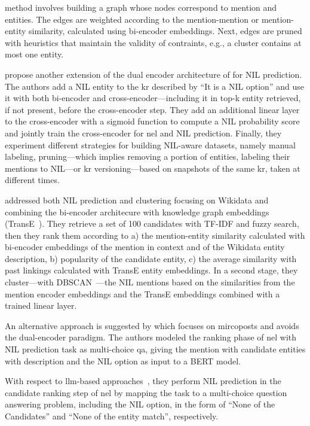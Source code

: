 \textcite{agarwal-etal-2022-entity} method involves building a graph whose nodes correspond to mention and entities. The edges are weighted according to the mention-mention or mention-entity similarity, calculated using bi-encoder embeddings. Next, edges are pruned with heuristics that maintain the validity of contraints, e.g., a cluster contains at most one entity.

\textcite{dong_reveal_the_unknown_2023} propose another extension of the dual encoder architecture of \textcite{blink} for NIL prediction. The authors add a NIL entity to the \ac{kr} described by ``It is a NIL option'' and use it with both bi-encoder and cross-encoder---including it in top-k entity retrieved, if not present, before the cross-encoder step. They add an additional linear layer to the cross-encoder with a sigmoid function to compute a NIL probability score and jointly train the cross-encoder for \ac{nel} and NIL prediction. Finally, they experiment different strategies for building NIL-aware datasets, namely manual labeling, pruning---which implies removing a portion of entities, labeling their mentions to NIL---or \ac{kr} versioning---based on snapshots of the same \ac{kr}, taken at different times.


\textcite{moller2024entity} addressed both NIL prediction and clustering focusing on Wikidata and combining the bi-encoder architecure with knowledge graph embeddings (TransE~\cite{transe_2013}). They retrieve a set of 100 candidates with TF-IDF and fuzzy search, then they rank them according to a) the mention-entity similarity calculated with bi-encoder embeddings of the mention in context and of the Wikidata entity description, b) popularity of the candidate entity, c) the average similarity with past linkings calculated with TransE entity embeddings. In a second stage, they cluster---with DBSCAN~\cite{dbscan_1996}---the NIL mentions based on the similarities from the mention encoder embeddings and the TransE embeddings combined with a trained linear layer.

An alternative approach is suggested by \textcite{Gu_Qu_Wang_Huai_Yuan_Gui_2021} which focuses on mircoposts and avoids the dual-encoder paradigm. The authors modeled the ranking phase of \ac{nel} with NIL prediction task as multi-choice \acl{qa}, giving the mention with candidate entities with description and the NIL option as input to a BERT model.

With respect to \ac{llm}-based approaches~\cite{zhou-etal-2024-gendecider,ding-etal-2024-chatel}, they perform NIL prediction in the candidate ranking step of \ac{nel} by mapping the task to a multi-choice question answering problem, including the NIL option, in the form of ``None of the Candidates'' and ``None of the entity match'', respectively.









